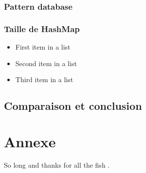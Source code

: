 \documentclass[fleqn,10pt,french]{SelfArx} %
\begin{document}
\subsubsection{Pattern database}

\lipsum[13] %

\subsubsection{Taille de HashMap}

\lipsum[13] %

\begin{itemize}[noitemsep] %
\item First item in a list
\item Second item in a list
\item Third item in a list
\end{itemize}

\subsection{Comparaison et conclusion}

\lipsum[15-23] %

\section*{Annexe} %


So long and thanks for all the fish \cite{Figueredo:2009dg}.
\end{document}
